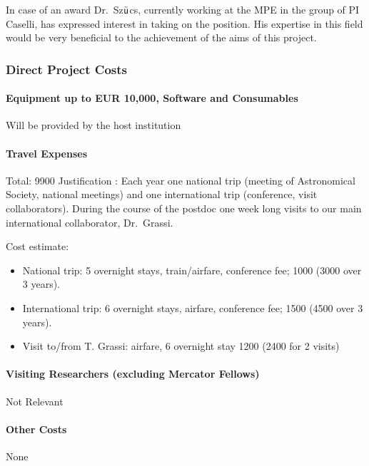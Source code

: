 \documentclass[10pt,fleqn,twoside]{article}
\begin{document}
In case of an award Dr.\ Sz$\ddot{\textsf u}$cs, currently working at
the MPE in the group of PI Caselli, has expressed interest in taking on the position. His expertise in this field would be very beneficial to the achievement of the aims of this project.

\subsubsection{Direct Project Costs}


\paragraph{Equipment up to EUR 10,000, Software and Consumables}

Will be provided by the host institution

\paragraph{Travel Expenses}

Total: 9900 \EUR{} Justification : Each year one national trip (meeting of Astronomical Society, national
meetings) and one international trip (conference, visit
collaborators). 
During the course of the postdoc one week long visits to our main
international collaborator, Dr.\ Grassi. 

Cost estimate: 
\begin{itemize}
\item National trip: 5 overnight stays, train/airfare,
conference fee; 1000 \EUR{} (3000 over 3 years).
\item International trip: 6 overnight stays, airfare, conference fee;
  1500 \EUR{} (4500 over 3 years).
\item Visit to/from T. Grassi: airfare, 6 overnight stay 1200 \EUR{} (2400
  for 2 visits)
\end{itemize}

\paragraph{Visiting Researchers (excluding Mercator Fellows)}

Not Relevant 


\paragraph{Other Costs}

None
\end{document}
